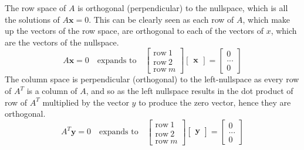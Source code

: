         \par \hfill \break
        The row space of \(A\) is orthogonal (perpendicular) to the nullspace, which is all the solutions of 
        \(A\boldsymbol{x}=0\). This can be clearly seen as each row of \(A\), which make up the vectors of the row
        space, are orthogonal to each of the vectors of \(x\), which are the vectors of the nullspace.
        \begin{equation}
            A \boldsymbol{x} = 0
            \quad \textrm{expands to} \quad
            \begin{bmatrix}
                \textrm{row} \ 1 \\
                \textrm{row} \ 2 \\
                \textrm{row} \ m
            \end{bmatrix}
            \begin{bmatrix}
                \boldsymbol{x}
            \end{bmatrix}
            =
            \begin{bmatrix}
                0 \\ ... \\ 0
            \end{bmatrix}
        \end{equation}
        The column space is perpendicular (orthogonal) to the left-nullspace as every row of \(A^T\) is a column of 
        \(A\), and so as the left nullspace results in the dot product of row of \(A^T\) multiplied by the vector \(y\)
        to produce the zero vector, hence they are orthogonal.
        \begin{equation}
            A^T \boldsymbol{y} = 0
            \quad \textrm{expands to} \quad
            \begin{bmatrix}
                \textrm{row} \ 1 \\
                \textrm{row} \ 2 \\
                \textrm{row} \ m
            \end{bmatrix}
            \begin{bmatrix}
                \boldsymbol{y}
            \end{bmatrix}
            =
            \begin{bmatrix}
                0 \\ ... \\ 0
            \end{bmatrix}
        \end{equation}

